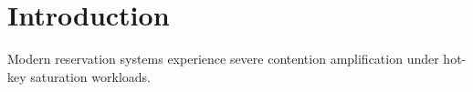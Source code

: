 \section{Introduction}

Modern reservation systems experience severe contention amplification under hot-key saturation workloads.
